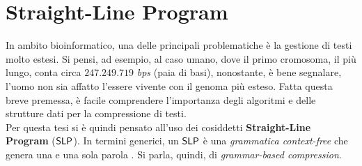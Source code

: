 \section{Straight-Line Program}
\label{slpsec}
In ambito bioinformatico, una delle principali problematiche è la
gestione di testi molto estesi. Si pensi, ad esempio, al caso umano, dove il
primo cromosoma, il più lungo, conta circa $247.249.719$
\textit{bps} (paia di basi), nonostante, è bene segnalare, l'uomo
non sia affatto l'essere vivente con il genoma più esteso. Fatta questa breve
premessa, è facile comprendere l'importanza degli algoritmi e delle strutture
dati per la compressione di testi.\\
Per questa tesi si è quindi pensato all'uso dei cosiddetti \textbf{Straight-Line
  Program} ($\mbox{\rm {\sf SLP}}$). In termini 
generici, un $\mbox{\rm {\sf SLP}}$ è una \textit{grammatica context-free} che 
genera una e una sola parola \cite{slpsurvey}. Si parla, quindi, di
\textit{grammar-based compression}.
